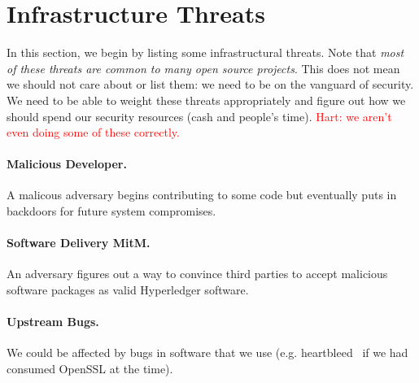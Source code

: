 
\section{Infrastructure Threats}

In this section, we begin by listing some infrastructural threats.  Note that \emph{most of these threats are common to many open source projects}.  This does not mean we should not care about or list them:  we need to be on the vanguard of security.  We need to be able to weight these threats appropriately and figure out how we should spend our security resources (cash and people's time). \textcolor{red}{Hart: we aren't even doing some of these correctly.}

\paragraph{Malicious Developer.}  A malicous adversary begins contributing to some code but eventually puts in backdoors for future system compromises.

\paragraph{Software Delivery MitM.}  An adversary figures out a way to convince third parties to accept malicious software packages as valid Hyperledger software.

\paragraph{Upstream Bugs.}  We could be affected by bugs in software that we use (e.g. heartbleed~\cite{durumeric2014matter} if we had consumed OpenSSL at the time).